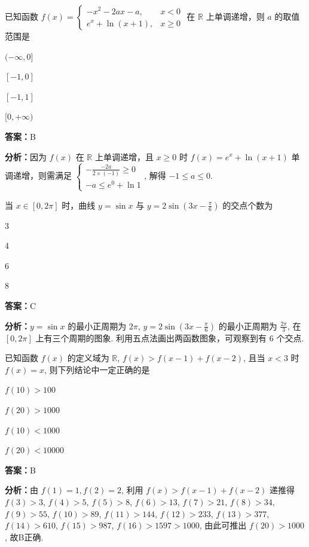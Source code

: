 \begin{question}[points=5]
已知函数 $f(x) = \begin{cases} -x^2 - 2ax - a, & x < 0 \\ e^x + \ln(x+1), & x \ge 0 \end{cases}$ 在 $\mathbb{R}$ 上单调递增，则 $a$ 的取值范围是
\begin{choices}
  \item $(-\infty, 0]$
  \item $[-1, 0]$
  \item $[-1, 1]$
  \item $[0, +\infty)$
\end{choices}
\begin{solution}
\textbf{答案：}B

\textbf{分析：}因为 $f(x)$ 在 $\mathbb{R}$ 上单调递增，且 $x \ge 0$ 时 $f(x) = e^x + \ln(x+1)$ 单调递增，则需满足 $\begin{cases} -\frac{-2a}{2 \times (-1)} \ge 0 \\ -a \le e^0 + \ln 1 \end{cases}$, 解得 $-1 \le a \le 0$.
\end{solution}
\end{question}

\begin{question}[points=5]
当 $x \in [0, 2\pi]$ 时，曲线 $y = \sin x$ 与 $y = 2 \sin\left(3x - \frac{\pi}{6}\right)$ 的交点个数为
\begin{choices}
  \item 3
  \item 4
  \item 6
  \item 8
\end{choices}
\begin{solution}
\textbf{答案：}C

\textbf{分析：}$y = \sin x$ 的最小正周期为 $2\pi$, $y = 2\sin(3x - \frac{\pi}{6})$ 的最小正周期为 $\frac{2\pi}{3}$, 在 $[0,2\pi]$ 上有三个周期的图象. 利用五点法画出两函数图象，可观察到有 6 个交点.
\end{solution}
\end{question}

\begin{question}[points=5]
已知函数 $f(x)$ 的定义域为 $\mathbb{R}$, $f(x) > f(x-1) + f(x-2)$, 且当 $x < 3$ 时 $f(x) = x$, 则下列结论中一定正确的是
\begin{choices}
  \item $f(10) > 100$
  \item $f(20) > 1000$
  \item $f(10) < 1000$
  \item $f(20) < 10000$
\end{choices}
\begin{solution}
\textbf{答案：}B

\textbf{分析：}由 $f(1)=1, f(2)=2$, 利用 $f(x) > f(x-1)+f(x-2)$ 递推得 $f(3)>3$, $f(4)>5$, $f(5)>8$, $f(6)>13$, $f(7)>21$, $f(8)>34$, $f(9)>55$, $f(10)>89$, $f(11)>144$, $f(12)>233$, $f(13)>377$, $f(14)>610$, $f(15)>987$, $f(16)>1597>1000$, 由此可推出 $f(20)>1000$, 故B正确.
\end{solution}
\end{question}

